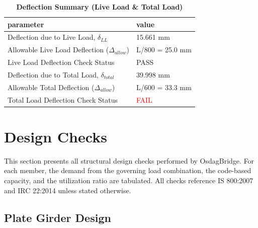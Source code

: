 \documentclass[12pt,a4paper]{report}
\numberwithin{table}{chapter}
\numberwithin{figure}{chapter}
\begin{document}
\vspace{1em}
\begin{longtable}{|L{7cm}|p{8.5cm}|}
\caption{\textbf{Deflection Summary (Live Load \& Total Load)}}
\hline
\textbf{parameter} & \textbf{value} \\
\hline
\textnormal{Deflection due to Live Load, $\delta_{LL}$} & 15.661 mm \\[6pt]
\hline
\textnormal{Allowable Live Load Deflection ($\Delta_{allow}$)} & L/800 = 25.0 mm \\[6pt]
\hline
\textnormal{Live Load Deflection Check Status} & PASS \\[6pt]
\hline
\textnormal{Deflection due to Total Load, $\delta_{total}$} & 39.998 mm \\[6pt]
\hline
\textnormal{Allowable Total Deflection ($\Delta_{allow}$)} & L/600 = 33.3 mm \\[6pt]
\hline
\textnormal{Total Load Deflection Check Status} & \textcolor{red}{FAIL} \\[6pt]
\hline
\end{longtable}

\vspace{1em}
\noindent
\noindent{}
\noindent{}
\noindent{}


\chapter{Design Checks}

This section presents all structural design checks performed by OsdagBridge. For each member, the demand from the governing load combination, the code-based capacity, and the utilization ratio are tabulated. All checks reference IS 800:2007 and IRC 22:2014 unless stated otherwise.

\section{Plate Girder Design}
\label{sec:plate-girder}
\end{document}
